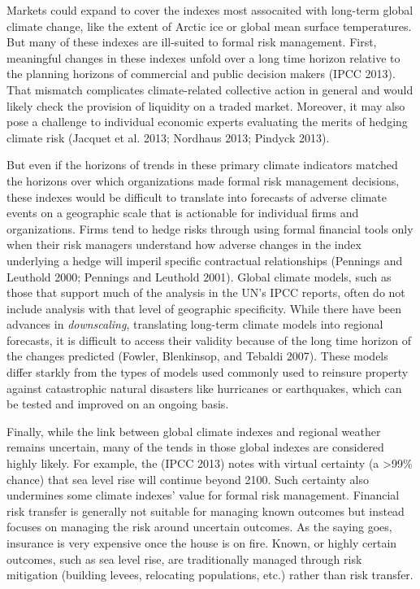 \documentclass[article]{jss}
\begin{document}
Markets could expand to cover the indexes most assocaited with long-term
global climate change, like the extent of Arctic ice or global mean
surface temperatures. But many of these indexes are ill-suited to formal
risk management. First, meaningful changes in these indexes unfold over
a long time horizon relative to the planning horizons of commercial and
public decision makers ({IPCC} 2013). That mismatch complicates
climate-related collective action in general and would likely check the
provision of liquidity on a traded market. Moreover, it may also pose a
challenge to individual economic experts evaluating the merits of
hedging climate risk (Jacquet et al. 2013; Nordhaus 2013; Pindyck 2013).

But even if the horizons of trends in these primary climate indicators
matched the horizons over which organizations made formal risk
management decisions, these indexes would be difficult to translate into
forecasts of adverse climate events on a geographic scale that is
actionable for individual firms and organizations. Firms tend to hedge
risks through using formal financial tools only when their risk managers
understand how adverse changes in the index underlying a hedge will
imperil specific contractual relationships (Pennings and Leuthold 2000;
Pennings and Leuthold 2001). Global climate models, such as those that
support much of the analysis in the UN's IPCC reports, often do not
include analysis with that level of geographic specificity. While there
have been advances in \emph{downscaling}, translating long-term climate
models into regional forecasts, it is difficult to access their validity
because of the long time horizon of the changes predicted (Fowler,
Blenkinsop, and Tebaldi 2007). These models differ starkly from the
types of models used commonly used to reinsure property against
catastrophic natural disasters like hurricanes or earthquakes, which can
be tested and improved on an ongoing basis.

Finally, while the link between global climate indexes and regional
weather remains uncertain, many of the tends in those global indexes are
considered highly likely. For example, the ({IPCC} 2013) notes with
virtual certainty (a \textgreater{}99\% chance) that sea level rise will
continue beyond 2100. Such certainty also undermines some climate
indexes' value for formal risk management. Financial risk transfer is
generally not suitable for managing known outcomes but instead focuses
on managing the risk around uncertain outcomes. As the saying goes,
insurance is very expensive once the house is on fire. Known, or highly
certain outcomes, such as sea level rise, are traditionally managed
through risk mitigation (building levees, relocating populations, etc.)
rather than risk transfer.
\end{document}
